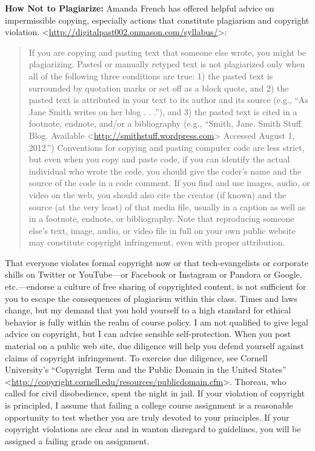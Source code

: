 \documentclass[]{article}
\begin{document}
\textbf{How Not to Plagiarize: } Amanda French has offered helpful
advice on impermissible copying, especially actions that constitute
plagiarism and copyright violation.
\textless{}\url{http://digitalpast002.onmason.com/syllabus/}\textgreater{}:

\begin{quote}
If you are copying and pasting text that someone else wrote, you might
be plagiarizing. Pasted or manually retyped text is not plagiarized only
when all of the following three conditions are true: 1) the pasted text
is surrounded by quotation marks or set off as a block quote, and 2) the
pasted text is attributed in your text to its author and its source
(e.g., ``As Jane Smith writes on her blog . . .''), and 3) the pasted
text is cited in a footnote, endnote, and/or a bibliography (e.g.,
``Smith, Jane. Smith Stuff. Blog. Available
\textless{}\url{http://smithstuff.wordpress.com}\textgreater{} Accessed
August 1, 2012.'') Conventions for copying and pasting computer code are
less strict, but even when you copy and paste code, if you can identify
the actual individual who wrote the code, you should give the coder's
name and the source of the code in a code comment. If you find and use
images, audio, or video on the web, you should also cite the creator (if
known) and the source (at the very least) of that media file, usually in
a caption as well as in a footnote, endnote, or bibliography. Note that
reproducing someone else's text, image, audio, or video file in full on
your own public website may constitute copyright infringement, even with
proper attribution.
\end{quote}

That everyone violates formal copyright now or that tech-evangelists or
corporate shills on Twitter or YouTube---or Facebook or Instagram or
Pandora or Google, etc.---endorse a culture of free sharing of
copyrighted content, is not sufficient for you to escape the
consequences of plagiarism within this class. Times and laws change, but
my demand that you hold yourself to a high standard for ethical behavior
is fully within the realm of course policy. I am not qualified to give
legal advice on copyright, but I can advise sensible self-protection.
When you post material on a public web site, due diligence will help you
defend yourself against claims of copyright infringement. To exercise
due diligence, see Cornell University's ``Copyright Term and the Public
Domain in the United States''
\textless{}\url{http://copyright.cornell.edu/resources/publicdomain.cfm}\textgreater{}.
Thoreau, who called for civil disobedience, spent the night in jail. If
your violation of copyright is principled, I assume that failing a
college course assignment is a reasonable opportunity to test whether
you are truly devoted to your principles. If your copyright violations
are clear and in wanton disregard to guidelines, you will be assigned a
failing grade on assignment.
\end{document}
